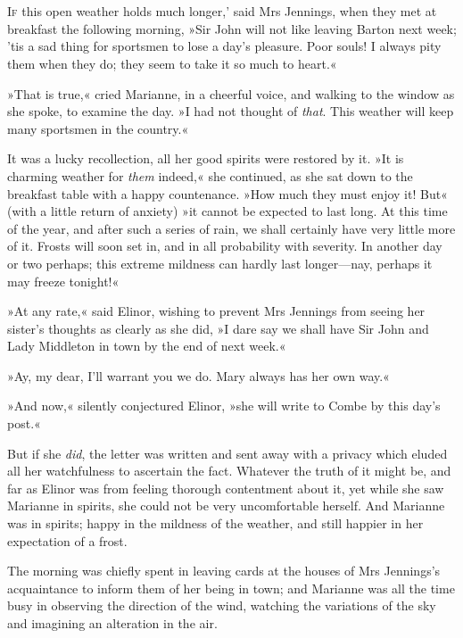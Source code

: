 \chapter[Chapter \thechapter]{}
	\lettrine[ante=`, lines=4,lraise=0.3]{I}{f} this open weather holds much longer,' said Mrs Jennings, when they met at breakfast the following morning, »Sir John will not like leaving Barton next week; ’tis a sad thing for sportsmen to lose a day’s pleasure. Poor souls! I always pity them when they do; they seem to take it so much to heart.«

»That is true,« cried Marianne, in a cheerful voice, and walking to the window as she spoke, to examine the day. »I had not thought of \textit{that}. This weather will keep many sportsmen in the country.«

It was a lucky recollection, all her good spirits were restored by it. »It is charming weather for \textit{them} indeed,« she continued, as she sat down to the breakfast table with a happy countenance. »How much they must enjoy it! But« (with a little return of anxiety) »it cannot be expected to last long. At this time of the year, and after such a series of rain, we shall certainly have very little more of it. Frosts will soon set in, and in all probability with severity. In another day or two perhaps; this extreme mildness can hardly last longer—nay, perhaps it may freeze tonight!«

»At any rate,« said Elinor, wishing to prevent Mrs Jennings from seeing her sister’s thoughts as clearly as she did, »I dare say we shall have Sir John and Lady Middleton in town by the end of next week.«

»Ay, my dear, I’ll warrant you we do. Mary always has her own way.«

»And now,« silently conjectured Elinor, »she will write to Combe by this day’s post.«

But if she \textit{did}, the letter was written and sent away with a privacy which eluded all her watchfulness to ascertain the fact. Whatever the truth of it might be, and far as Elinor was from feeling thorough contentment about it, yet while she saw Marianne in spirits, she could not be very uncomfortable herself. And Marianne was in spirits; happy in the mildness of the weather, and still happier in her expectation of a frost.

The morning was chiefly spent in leaving cards at the houses of Mrs Jennings’s acquaintance to inform them of her being in town; and Marianne was all the time busy in observing the direction of the wind, watching the variations of the sky and imagining an alteration in the air.

